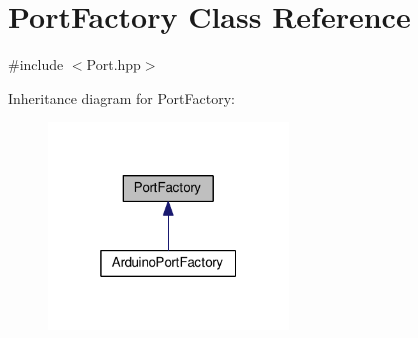 \hypertarget{classPortFactory}{}\section{Port\+Factory Class Reference}
\label{classPortFactory}


{\ttfamily \#include $<$Port.\+hpp$>$}



Inheritance diagram for Port\+Factory\+:\nopagebreak
\begin{figure}[H]
\begin{center}
\leavevmode
\includegraphics[width=181pt]{classPortFactory__inherit__graph}
\end{center}
\end{figure}
